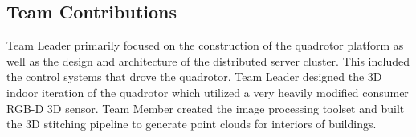 \subsection{Team Contributions}
Team Leader primarily focused on the construction of the quadrotor platform as well as the design and architecture of the distributed server cluster. This included the control systems that drove the quadrotor. Team Leader designed the 3D indoor iteration of the quadrotor which utilized a very heavily modified consumer RGB-D 3D sensor.
Team Member created the image processing toolset and built the 3D stitching pipeline to generate point clouds for interiors of buildings.
